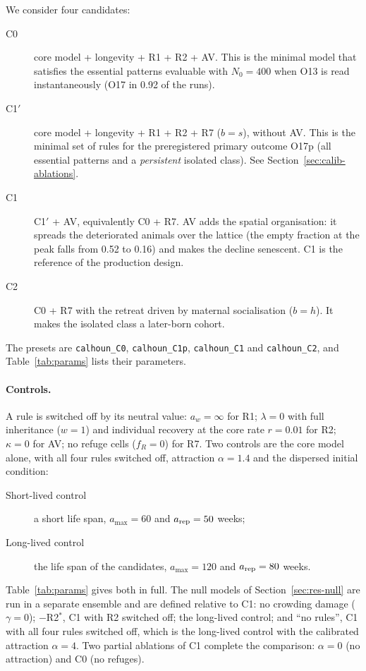 We consider four candidates:
\begin{description}
  \item[\textsf{C0}] core model + longevity + R1 + R2 + AV. This is the minimal model that satisfies the essential
    patterns evaluable with $N_0=400$ when O13 is read instantaneously (O17 in 0.92 of the runs).
  \item[\textsf{C1$'$}] core model + longevity + R1 + R2 + R7 ($b=s$), without AV. This is the minimal set
    of rules for the preregistered primary outcome O17p (all essential patterns and a \emph{persistent}
    isolated class). See Section~\ref{sec:calib-ablations}.
  \item[\textsf{C1}] \textsf{C1$'$} + AV, equivalently \textsf{C0} + R7. AV adds the spatial organisation: it spreads
    the deteriorated animals over the lattice (the empty fraction at the peak falls from 0.52 to 0.16) and makes the
    decline senescent. \textsf{C1} is the reference of the production design.
  \item[\textsf{C2}] \textsf{C0} + R7 with the retreat driven by maternal socialisation ($b=h$). It makes the isolated
    class a later-born cohort.
\end{description}
The presets are \texttt{calhoun\_C0}, \texttt{calhoun\_C1p}, \texttt{calhoun\_C1} and \texttt{calhoun\_C2},
and Table~\ref{tab:params} lists their parameters.

\paragraph{Controls.}
A rule is switched off by its neutral value: $a_w=\infty$ for R1; $\lambda=0$ with full inheritance ($w=1$) and
individual recovery at the core rate $r=0.01$ for R2; $\kappa=0$ for AV; no refuge cells ($f_R=0$) for R7. Two
controls are the core model alone, with all four rules switched off, attraction $\alpha=1.4$ and the dispersed
initial condition:
\begin{description}
  \item[Short-lived control] a short life span, $a_{\max}=60$ and $a_{\rm rep}=50$ weeks;
  \item[Long-lived control] the life span of the candidates, $a_{\max}=120$ and $a_{\rm rep}=80$ weeks.
\end{description}
Table~\ref{tab:params} gives both in full. The null models of Section~\ref{sec:res-null} are run in a separate
ensemble and are defined relative to \textsf{C1}: no crowding damage ($\gamma=0$); $-$R2$^*$, \textsf{C1} with R2
switched off; the long-lived control; and ``no rules'', \textsf{C1} with all four rules switched off, which is the
long-lived control with the calibrated attraction $\alpha=4$. Two partial ablations of \textsf{C1} complete the
comparison: $\alpha=0$ (no attraction) and \textsf{C0} (no refuges).

